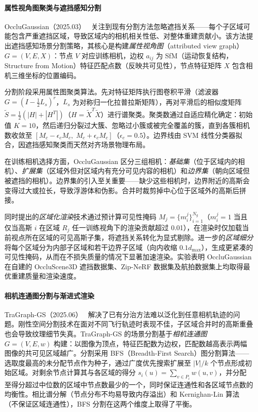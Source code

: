 \paragraph{属性视角图聚类与遮挡感知分割}

OccluGaussian（2025.03）~\cite{2503_16177} 关注到现有分割方法忽略遮挡关系——每个子区域可能包含严重遮挡区域，导致区域内的相机相关性低、对整体重建贡献小。该方法提出遮挡感知场景分割策略，其核心是构建\emph{属性视角图}（attributed view graph）$G = (V, E, X)$：节点 $V$ 对应训练相机，边权 $a_{ij}$ 为 SfM（运动恢复结构，Structure from Motion）特征匹配点数（反映共可见性），节点特征矩阵 $X$ 包含相机三维坐标的位置编码。

分割阶段采用属性图聚类算法。先对特征矩阵执行图卷积平滑（滤波器 $G = (I - \frac{1}{2}L_s)^r$，$L_s$ 为对称归一化拉普拉斯矩阵），再对平滑后的相似度矩阵 $\tilde{S} = \frac{1}{2}(|H| + |H^T|)$（$H = \tilde{X}^T\tilde{X}$）进行谱聚类。聚类数通过自适应精化确定：初始值 $K=10$，然后递归分裂过大簇、忽略过小簇或被完全覆盖的簇，直到各簇相机数收敛至 $[M_c - \epsilon_c M_c,\; M_c + \epsilon_c M_c]$（$\epsilon_c = 0.5$）。边界线由 SVM 线性分类器拟合，因遮挡感知聚类而天然对齐场景物理布局。

在训练相机选择方面，OccluGaussian 区分三组相机：\emph{基础集}（位于区域内的相机）、\emph{扩展集}（区域外但对区域内有充分可见内容的相机）和\emph{边界集}（朝向区域但被遮挡的相机）。边界集的引入至关重要——缺少这些相机时，边界附近的高斯会变得过大或拉长，导致浮游体和伪影。合并时裁剪掉中心位于区域外的高斯后拼接。

同时提出的\emph{区域化渲染}技术通过预计算可见性掩码 $M_j = \{m_i^j\}_{i=1}^{N_g}$（$m_i^j = 1$ 当且仅当高斯 $i$ 在区域 $R_j$ 任一训练视角下的渲染贡献超过 0.01），在渲染时仅加载当前视点所在区域的可见高斯子集，将遮挡关系转化为显式剔除。进一步的\emph{区域细分}将每个区域分为内部子区域和若干边界子区域（向内收缩 $0.1 d_{\max}$），生成更紧凑的可见性掩码，从而在不损失质量的情况下显著加速渲染。实验表明 OccluGaussian 在自建的 OccluScene3D 遮挡数据集、Zip-NeRF 数据集及航拍数据集上均取得最优重建质量和渲染速度。

\paragraph{相机连通图分割与渐进式渲染}

TraGraph-GS（2025.06）~\cite{2506_08704} 解决了已有分治方法难以泛化到任意相机轨迹的问题。刚性空间分割技术在面对不同飞行轨迹时表现不佳，子区域合并时的高斯重叠也会导致纹理细节失真。TraGraph-GS 的场景分割基于\emph{相机连通图} $G = (V, E, w)$ 构建：以图像为顶点，特征匹配数为边权，匹配数越高表示两幅图像的共可见区域越广。分割采用 BFS（Breadth-First Search）图分割算法——选取度最高的未分配节点作为种子，通过广度优先搜索扩展至 $|V|/k$ 个节点形成初始区域。对剩余节点计算其与各区域的得分 $s_i(u) = \sum_{v \in P_i} w(u,v)$，并分配至得分超过中位数的区域中节点数最少的一个，同时保证连通性和各区域节点数的均衡性。相比谱分解（节点分布不均易导致内存溢出）和 Kernighan-Lin 算法（不保证区域连通性），BFS 分割在这两个维度上取得了平衡。

